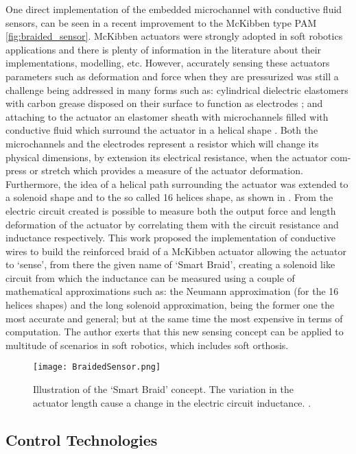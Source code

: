 One direct implementation of the embedded microchannel with conductive fluid sensors, can be seen in a recent improvement to the McKibben type PAM \autoref{fig:braided_sensor}. McKibben actuators were strongly adopted in soft robotics applications and there is plenty of information in the literature about their implementations, modelling, etc. However, accurately sensing these actuators parameters such as deformation and force when they are pressurized was still a challenge being addressed in many forms such as: cylindrical dielectric elastomers with carbon grease disposed on their surface to function as electrodes \cite{Goulbourne2007}; and attaching to the actuator an elastomer sheath with microchannels filled with conductive fluid which surround the actuator in a helical shape \cite{Park2013}. Both the microchannels and the electrodes represent a resistor which will change its physical dimensions, by extension its electrical resistance, when the actuator com-press or stretch which provides a measure of the actuator deformation. Furthermore, the idea of a helical path surrounding the actuator was extended to a solenoid shape and to the so called 16 helices shape, as shown in \cite{Felt2014,Felt2015}. From the electric circuit created is possible to measure both the output force and length deformation of the actuator by correlating them with the circuit resistance and inductance respectively. This work proposed the implementation of conductive wires to build the reinforced braid of a McKibben actuator allowing the actuator to `sense', from there the given name of `Smart Braid', creating a solenoid like circuit from which the inductance can be measured using a couple of mathematical approximations such as: the Neumann approximation (for the 16 helices shapes) and the long solenoid approximation, being the former one the most accurate and general; but at the same time the most expensive in terms of computation. The author exerts that this new sensing concept can be applied to multitude of scenarios in soft robotics, which includes soft orthosis.

\begin{figure}[hbtp!]
    \centering
    \texttt{[image: BraidedSensor.png]}
    \caption{Illustration of the `Smart Braid' concept. The variation in the actuator length cause a change in the electric circuit inductance. \cite{Felt2015}. }
    \label{fig:braided_sensor}
\end{figure}

\subsection{Control Technologies} \label{sec:controlSystems}

